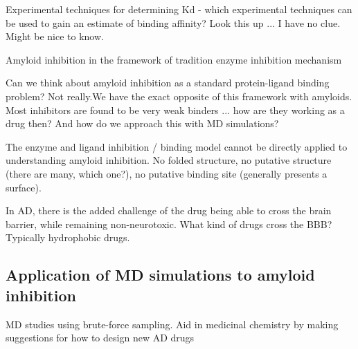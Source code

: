  \2 Experimental techniques for determining Kd - which experimental techniques can be used to gain an estimate of binding affinity?
   \3 Look this up ... I have no clue.  Might be nice to know.

  \2 Amyloid inhibition in the framework of tradition enzyme inhibition mechanism

    \3 Can we think about amyloid inhibition as a standard protein-ligand binding problem? Not really.We have the exact opposite of this framework with amyloids. Most inhibitors are found to be very weak binders ... how are they working as a drug then? And how do we approach this with MD simulations?

    \3 The enzyme and ligand inhibition / binding model cannot be directly applied to understanding amyloid inhibition.  No folded structure, no putative structure (there are many, which one?), no putative binding site (generally presents a surface).

    \3 In AD, there is the added challenge of the drug being able to cross the brain barrier, while remaining non-neurotoxic.  What kind of drugs cross the BBB?  Typically hydrophobic drugs.
    
\subsection{Application of MD simulations to amyloid inhibition}
MD studies using brute-force sampling. Aid in medicinal chemistry by making suggestions for how to design new AD drugs

